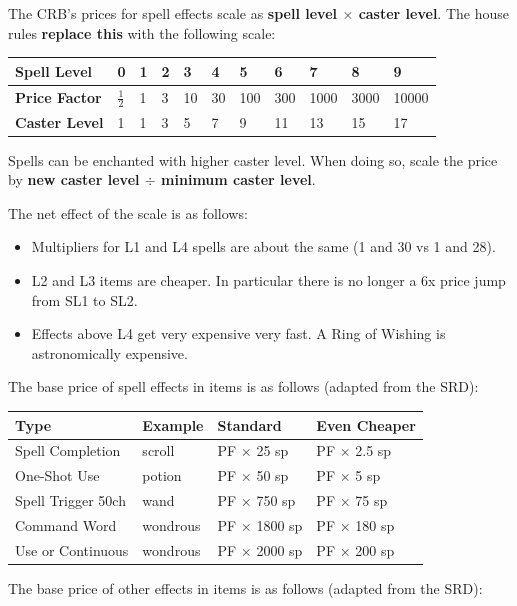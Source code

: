 The CRB's prices for spell effects scale as \textbf{spell level $\times$
caster level}. The house rules \textbf{replace this} with the following
scale:

\begin{tabular}{|l|l|lll|lll|lll|} \hline
\textbf{Spell Level} & 0 & 1 & 2 & 3 & 4 & 5 & 6 & 7 & 8 & 9 \\ \hline
\textbf{Price Factor} & $\frac{1}{2}$ & 1 & 3 & 10 & 30 & 100 & 300 &
1000 & 3000 & 10000 \\ \hline
\textbf{Caster Level} & 1 & 1 & 3 & 5 & 7 & 9 & 11 & 13 & 15 & 17 \\ \hline
\end{tabular}

Spells can be enchanted with higher caster level. When doing so, scale the
price by \textbf{new caster level $\div$ minimum caster level}.

The net effect of the scale is as follows:
\begin{itemize}
\item Multipliers for L1 and L4 spells are about the same (1 and 30 vs 1 and
28).
\item L2 and L3 items are cheaper. In particular there is no longer a 6x
price jump from SL1 to SL2.
\item Effects above L4 get very expensive very fast. A Ring of Wishing is
astronomically expensive.
\end{itemize}

The base price of spell effects in items is as follows (adapted from the SRD):

\begin{tabular}{llll} \hline
\textbf{Type} & \textbf{Example} & \textbf{Standard} & \textbf{Even Cheaper}
\\ \hline
Spell Completion & scroll & PF $\times$ 25 sp & PF $\times$ 2.5 sp \\
One-Shot Use & potion & PF $\times$ 50 sp & PF $\times$ 5 sp \\
Spell Trigger 50ch & wand & PF $\times$ 750 sp & PF $\times$ 75 sp \\
Command Word & wondrous & PF $\times$ 1800 sp & PF $\times$ 180 sp \\
Use or Continuous & wondrous & PF $\times$ 2000 sp & PF $\times$ 200 sp \\
\hline
\end{tabular}

The base price of other effects in items is as follows (adapted from the SRD):

